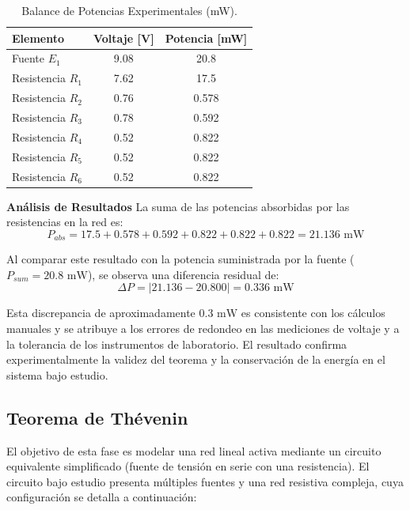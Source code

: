 \begin{table}[h!]
	\centering
	\caption{Balance de Potencias Experimentales (mW).}
	\label{tab:tellegen_mw}
	\begin{tabular}{|l|c|c|}
		\hline
		\textbf{Elemento} & \textbf{Voltaje [V]} & \textbf{Potencia [mW]} \\ \hline
		Fuente $E_1$ & 9.08 & 20.8 \\ \hline
		Resistencia $R_1$ & 7.62 & 17.5 \\ \hline
		Resistencia $R_2$ & 0.76 & 0.578 \\ \hline
		Resistencia $R_3$ & 0.78 & 0.592 \\ \hline
		Resistencia $R_4$ & 0.52 & 0.822 \\ \hline
		Resistencia $R_5$ & 0.52 & 0.822 \\ \hline
		Resistencia $R_6$ & 0.52 & 0.822 \\ \hline
	\end{tabular}
\end{table}

\textbf{Análisis de Resultados}
La suma de las potencias absorbidas por las resistencias en la red es:
\begin{equation}
	P_{abs} = 17.5 + 0.578 + 0.592 + 0.822 + 0.822 + 0.822 = 21.136 \text{ mW}
\end{equation}

Al comparar este resultado con la potencia suministrada por la fuente ($P_{sum} = 20.8 \text{ mW}$), se observa una diferencia residual de:
\begin{equation}
	\Delta P = |21.136 - 20.800| = 0.336 \text{ mW}
\end{equation}

Esta discrepancia de aproximadamente $0.3 \text{ mW}$ es consistente con los cálculos manuales y se atribuye a los errores de redondeo en las mediciones de voltaje y a la tolerancia de los instrumentos de laboratorio. El resultado confirma experimentalmente la validez del teorema y la conservación de la energía en el sistema bajo estudio.

\subsection{Teorema de Thévenin}

El objetivo de esta fase es modelar una red lineal activa mediante un circuito equivalente simplificado (fuente de tensión en serie con una resistencia). El circuito bajo estudio presenta múltiples fuentes y una red resistiva compleja, cuya configuración se detalla a continuación:

